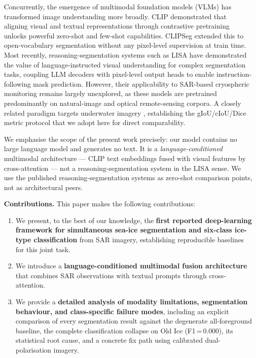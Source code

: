 \documentclass[remotesensing,article,accept,moreauthors,pdftex]{Definitions/mdpi}
\begin{document}
Concurrently, the emergence of multimodal foundation models (VLMs) has transformed
image understanding more broadly. CLIP \cite{radford2021learning} demonstrated
that aligning visual and textual representations through contrastive
pretraining unlocks powerful zero-shot and few-shot capabilities. CLIPSeg
\cite{luddecke2022image} extended this to open-vocabulary segmentation without
any pixel-level supervision at train time. Most recently, reasoning-segmentation
systems such as LISA \cite{lai2024lisa} have demonstrated the value of
language-instructed visual understanding for complex segmentation tasks,
coupling LLM decoders with pixel-level output heads to enable
instruction-following mask prediction. However, their applicability to
SAR-based cryospheric monitoring remains largely unexplored, as these models
are pretrained predominantly on natural-image and optical remote-sensing corpora.
A closely related paradigm targets underwater imagery \cite{underwater2024infofusion},
establishing the gIoU/cIoU/Dice metric protocol that we adopt here for direct
comparability.

We emphasise the scope of the present work precisely: our model contains no
large language model and generates no text. It is a \emph{language-conditioned}
multimodal architecture — CLIP text embeddings fused with visual features by
cross-attention — not a reasoning-segmentation system in the LISA sense. We
use the published reasoning-segmentation systems as zero-shot comparison
points, not as architectural peers.

\medskip
\noindent\textbf{Contributions.} This paper makes the following contributions:

\begin{enumerate}[leftmargin=*,label=\arabic*.]

  \item We present, to the best of our knowledge, the \textbf{first reported
        deep-learning framework for simultaneous sea-ice segmentation and
        six-class ice-type classification} from SAR imagery, establishing
        reproducible baselines for this joint task.

  \item We introduce a \textbf{language-conditioned multimodal fusion
        architecture} that combines SAR observations with textual prompts
        through cross-attention.

  \item We provide a \textbf{detailed analysis of modality limitations,
        segmentation behaviour, and class-specific failure modes}, including
        an explicit comparison of every segmentation result against the
        degenerate all-foreground baseline, the complete classification
        collapse on Old Ice (F1\,=\,0.000), its statistical root cause, and a
        concrete fix path using calibrated dual-polarisation imagery.

\end{enumerate}
\end{document}
